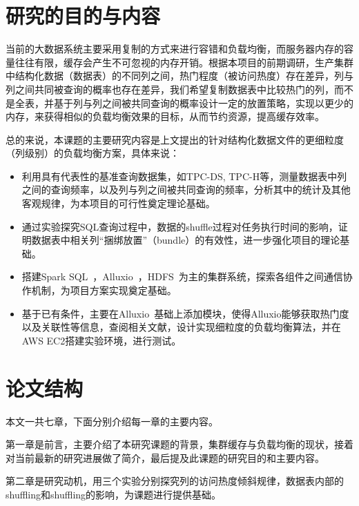 \section{研究的目的与内容}
当前的大数据系统主要采用复制的方式来进行容错和负载均衡，而服务器内存的容量往往有限，缓存会产生不可忽视的内存开销。根据本项目的前期调研，生产集群中结构化数据（数据表）的不同列之间，热门程度（被访问热度）存在差异，列与列之间共同被查询的概率也存在差异，我们希望复制数据表中比较热门的列，而不是全表，并基于列与列之间被共同查询的概率设计一定的放置策略，实现以更少的内存，来获得相似的负载均衡效果的目标，从而节约资源，提高缓存效率。

总的来说，本课题的主要研究内容是上文提出的针对结构化数据文件的更细粒度（列级别）的负载均衡方案，具体来说：

\begin{itemize}
	\item 利用具有代表性的基准查询数据集，如TPC-DS, TPC-H等，测量数据表中列之间的查询频率，以及列与列之间被共同查询的频率，分析其中的统计及其他客观规律，为本项目的可行性奠定理论基础。
	\item 通过实验探究SQL查询过程中，数据的shuffle过程对任务执行时间的影响，证明数据表中相关列“捆绑放置”（bundle）的有效性，进一步强化项目的理论基础。
	\item 搭建Spark SQL~\cite{armbrust2015spark}，Alluxio~\cite{alluxio}，HDFS~\cite{shvachko2010hadoop}为主的集群系统，探索各组件之间通信协作机制，为项目方案实现奠定基础。
	\item 基于已有条件，主要在Alluxio~\cite{alluxio}基础上添加模块，使得Alluxio能够获取热门度以及关联性等信息，查阅相关文献，设计实现细粒度的负载均衡算法，并在AWS EC2搭建实验环境，进行测试。
\end{itemize}

\section{论文结构}

\par 本文一共七章，下面分别介绍每一章的主要内容。%

\par 第一章是前言，主要介绍了本研究课题的背景，集群缓存与负载均衡的现状，接着对当前最新的研究进展做了简介，最后提及此课题的研究目的和主要内容。

\par 第二章是研究动机，用三个实验分别探究列的访问热度倾斜规律，数据表内部的shuffling和shuffling的影响，为课题进行提供基础。

